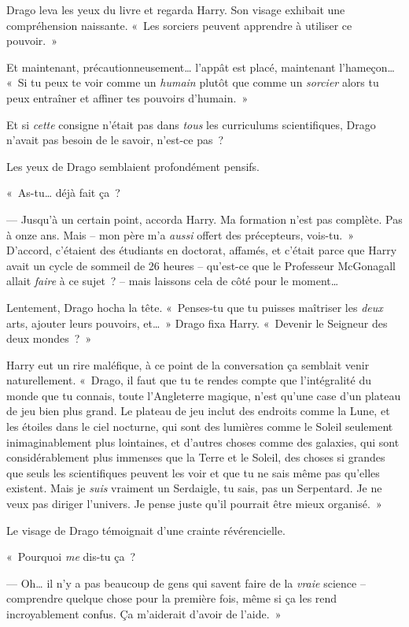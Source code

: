 Drago leva les yeux du livre et regarda Harry. Son visage exhibait une compréhension naissante. «~Les sorciers peuvent apprendre à utiliser ce pouvoir.~»

Et maintenant, précautionneusement… l'appât est placé, maintenant l'hameçon… «~Si tu peux te voir comme un \emph{humain} plutôt que comme un \emph{sorcier} alors tu peux entraîner et affiner tes pouvoirs d'humain.~»

Et si \emph{cette} consigne n'était pas dans \emph{tous} les curriculums scientifiques, Drago n'avait pas besoin de le savoir, n'est-ce pas~?

Les yeux de Drago semblaient profondément pensifs.

«~As-tu… déjà fait ça~?

--- Jusqu'à un certain point, accorda Harry. Ma formation n'est pas complète. Pas à onze ans. Mais -- mon père m'a \emph{aussi} offert des précepteurs, vois-tu.~» D'accord, c'étaient des étudiants en doctorat, affamés, et c'était parce que Harry avait un cycle de sommeil de 26 heures -- qu'est-ce que le Professeur McGonagall allait \emph{faire} à ce sujet~? -- mais laissons cela de côté pour le moment…

Lentement, Drago hocha la tête. «~Penses-tu que tu puisses maîtriser les \emph{deux} arts, ajouter leurs pouvoirs, et…~» Drago fixa Harry. «~Devenir le Seigneur des deux mondes~?~»

Harry eut un rire maléfique, à ce point de la conversation ça semblait venir naturellement. «~Drago, il faut que tu te rendes compte que l'intégralité du monde que tu connais, toute l'Angleterre magique, n'est qu'une case d'un plateau de jeu bien plus grand. Le plateau de jeu inclut des endroits comme la Lune, et les étoiles dans le ciel nocturne, qui sont des lumières comme le Soleil seulement inimaginablement plus lointaines, et d'autres choses comme des galaxies, qui sont considérablement plus immenses que la Terre et le Soleil, des choses si grandes que seuls les scientifiques peuvent les voir et que tu ne sais même pas qu'elles existent. Mais je \emph{suis} vraiment un Serdaigle, tu sais, pas un Serpentard. Je ne veux pas diriger l'univers. Je pense juste qu'il pourrait être mieux organisé.~»

Le visage de Drago témoignait d'une crainte révérencielle.

«~Pourquoi \emph{me} dis-tu ça~?

--- Oh… il n'y a pas beaucoup de gens qui savent faire de la \emph{vraie} science -- comprendre quelque chose pour la première fois, même si ça les rend incroyablement confus. Ça m'aiderait d'avoir de l'aide.~»

